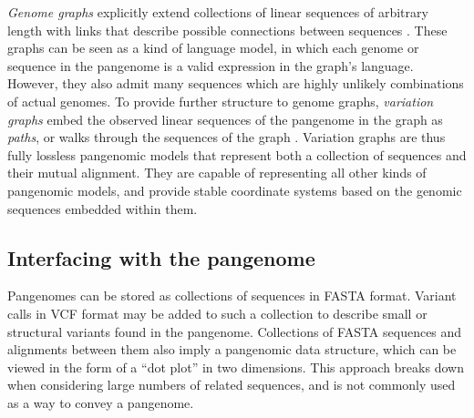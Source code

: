 \emph{Genome graphs} explicitly extend collections of linear sequences of arbitrary length with links that describe possible connections between sequences \cite{Paten_2017}.
These graphs can be seen as a kind of language model, in which each genome or sequence in the pangenome is a valid expression in the graph's language.
However, they also admit many sequences which are highly unlikely combinations of actual genomes.
To provide further structure to genome graphs, \emph{variation graphs} embed the observed linear sequences of the pangenome in the graph as \emph{paths}, or walks through the sequences of the graph \cite{Garrison_2018}.
Variation graphs are thus fully lossless pangenomic models that represent both a collection of sequences and their mutual alignment.
They are capable of representing all other kinds of pangenomic models, and provide stable coordinate systems based on the genomic sequences embedded within them.




\subsection{Interfacing with the pangenome}

Pangenomes can be stored as collections of sequences in FASTA format.
Variant calls in VCF format may be added to such a collection to describe small or structural variants found in the pangenome.
Collections of FASTA sequences and alignments between them also imply a pangenomic data structure, which can be viewed in the form of a ``dot plot'' in two dimensions.
This approach breaks down when considering large numbers of related sequences, and is not commonly used as a way to convey a pangenome.

